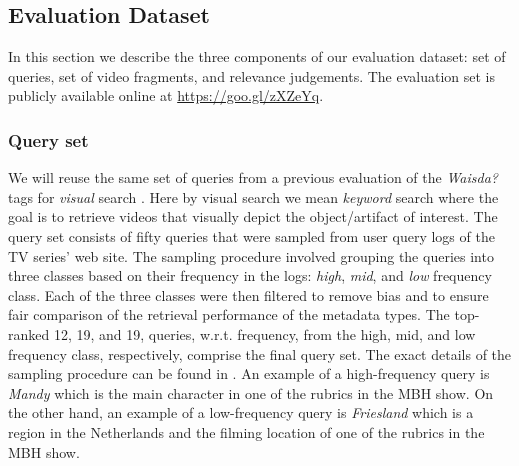 \subsection{Evaluation Dataset}\label{sec:topicir-filter:eval-ds}
In this section we describe the three components of our evaluation dataset: set of queries, set of video fragments, and relevance judgements. The evaluation set is publicly available online at \url{https://goo.gl/zXZeYq}.
\subsubsection{Query set}
We will reuse the same set of queries from a previous evaluation of the \textit{Waisda?} tags for \textit{visual} search \cite{ecir}. Here by visual search we mean \textit{keyword} search where the goal is to retrieve videos that visually depict the object/artifact of interest. The query set consists of fifty queries that were sampled from user query logs of the TV series' web site. The sampling procedure involved grouping the queries into three classes based on their frequency in the logs: \textit{high}, \textit{mid}, and \textit{low} frequency class. Each of the three classes were then filtered to remove bias and to ensure fair comparison of the retrieval performance of the metadata types. The top-ranked 12, 19, and 19, queries, w.r.t. frequency, from the high, mid, and low frequency class, respectively, comprise the final query set. The exact details of the sampling procedure can be found in \cite{ecir}. An example of a high-frequency query is \textit{Mandy} which is the main character in one of the rubrics in the MBH show. On the other hand, an example of a low-frequency query is \textit{Friesland} which is a region in the Netherlands and the filming location of one of the rubrics in the MBH show.

